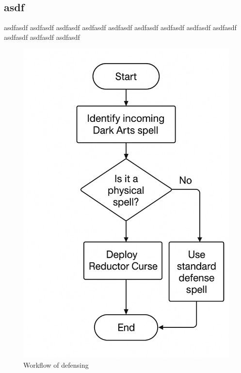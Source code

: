 \subsection{asdf}
asdfasdf asdfasdf asdfasdf asdfasdf asdfasdf asdfasdf asdfasdf asdfasdf asdfasdf asdfasdf asdfasdf asdfasdf



\begin{figure}
    \centering
    \includegraphics[width=0.5\linewidth]{images/workflow.png}
    \caption{Workflow of defensing}
    \label{fig:fig2}
\end{figure}
